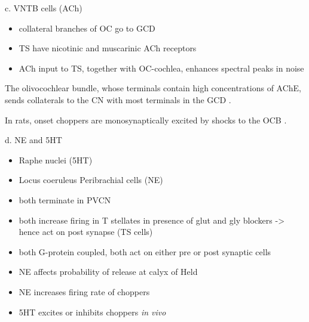 c. VNTB cells (ACh)

\begin{itemize}
\item collateral branches of OC go to GCD \citep{MellottMottsEtAl:2011,SherriffHenderson:1994,OsenRoth:1969}
\item TS have nicotinic and muscarinic ACh receptors \citep{FujinoOertel:2001}
\item ACh input to TS, together with OC-cochlea, enhances spectral peaks in noise  \citep{FujinoOertel:2001}
\end{itemize}

The olivocochlear bundle, whose terminals contain high concentrations of AChE, sends collaterals to the CN with most terminals in the GCD \citep{MellottMottsEtAl:2011,SherriffHenderson:1994,OsenRoth:1969}. %

In rats, onset choppers are monosynaptically excited by shocks to the OCB \citep{MuldersPaoliniEtAl:2003,MuldersWinterEtAl:2002,MuldersPaoliniEtAl:2009}.



d. NE and 5HT

\begin{itemize}
\item Raphe nuclei (5HT)
\item Locus coeruleus Peribrachial cells (NE)
\item both terminate in PVCN \citep{KlepperHerbert:1991,Thompson:2003,ThompsonLauder:2005,Thompson:2003a,ThompsonWiechmann:2002,BehrensSchofieldEtAl:2002,ThompsonThompson:2001,ThompsonThompson:2001a,ThompsonMooreEtAl:1995,ThompsonThompsonEtAl:1994}
\item both increase firing in T stellates \citep{OertelWrightEtAl:2010} in presence of glut and gly blockers -> hence act on post synapse (TS cells)
\item both G-protein coupled, both act on either pre or post synaptic cells
\item NE affects probability of release at calyx of Held
\item NE increases firing rate of choppers \citep{KosslVater:1989,Ebert:1996}
\item 5HT excites or inhibits choppers \emph{in vivo} \citep{EbertOstwald:1992}
\end{itemize}




